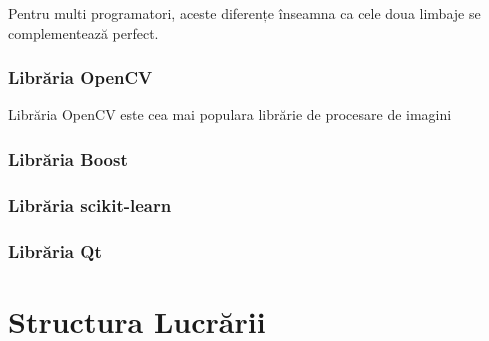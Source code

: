 Pentru multi programatori, aceste diferențe înseamna ca cele doua limbaje se complementează perfect.

\subsubsection{Librăria OpenCV}

Librăria OpenCV este cea mai populara librărie de procesare de imagini


\subsubsection{Librăria Boost}

\subsubsection{Librăria scikit-learn}

\subsubsection{Librăria Qt}



\section{Structura Lucrării}
